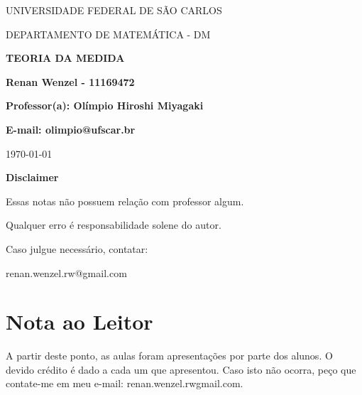 \documentclass{article}
\begin{document}
\begin{center}
	\vspace{1cm}
	\LARGE
	UNIVERSIDADE FEDERAL DE S\~AO CARLOS

	\vspace{1.3cm}
	\LARGE
	DEPARTAMENTO DE MATEMÁTICA - DM

	\vspace{1.7cm}
	\Large
	\textbf{TEORIA DA MEDIDA}

	\vspace{1.3cm}
	\large
	\textbf{Renan Wenzel - 11169472}

	\vspace{1.3cm}
	\large
	\textbf{Professor(a): Olímpio Hiroshi Miyagaki}

	\textbf{E-mail: olimpio@ufscar.br}

	\vspace{1.3cm}
	\today
\end{center}

\newpage
\textbf{{\Huge Disclaimer}}
\vspace{5cm}

{\huge Essas notas não possuem relação com professor algum.

	Qualquer erro é responsabilidade solene do autor.

	Caso julgue necessário, contatar:

	renan.wenzel.rw@gmail.com}
\tableofcontents

\newpage



\newpage

\newpage

\newpage

\newpage

\newpage

\newpage

\newpage

\newpage

\newpage

\newpage
\section*{Nota ao Leitor}
A partir deste ponto, as aulas foram apresentações por parte dos alunos. O devido crédito é dado a cada um que apresentou. Caso isto não ocorra, peço que contate-me em meu e-mail: renan.wenzel.rw\@ gmail.com.

\newpage

\newpage

\newpage

\newpage
\end{document}
